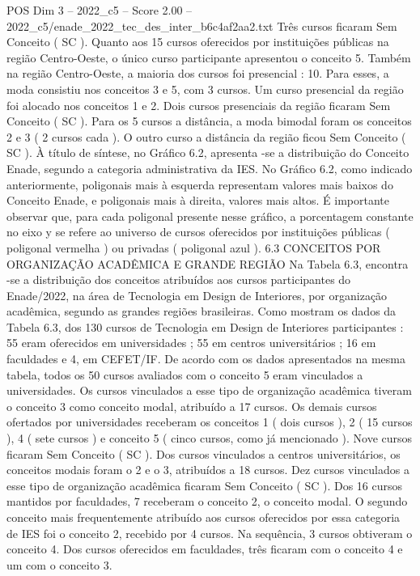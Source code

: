 \begin{textsample}{POS Dim 3 – 2022\_c5 – Score 2.00 – 2022\_c5/enade\_2022\_tec\_des\_inter\_b6c4af2aa2.txt}
Três cursos ficaram Sem Conceito ( SC ).
Quanto aos 15 cursos oferecidos por instituições públicas na região Centro-Oeste, o único curso participante apresentou o conceito 5.
Também na região Centro-Oeste, a maioria dos cursos foi presencial : 10.
Para esses, a moda consistiu nos conceitos 3 e 5, com 3 cursos.
Um curso presencial da região foi alocado nos conceitos 1 e 2.
Dois cursos presenciais da região ficaram Sem Conceito ( SC ).
Para os 5 cursos a distância, a moda bimodal foram os conceitos 2 e 3 ( 2 cursos cada ).
O outro curso a distância da região ficou Sem Conceito ( SC ).
À título de síntese, no Gráfico 6.2, apresenta -se a distribuição do Conceito Enade, segundo a categoria administrativa da IES.
No Gráfico 6.2, como indicado anteriormente, poligonais mais à esquerda representam valores mais baixos do Conceito Enade, e poligonais mais à direita, valores mais altos.
É importante observar que, para cada poligonal presente nesse gráfico, a porcentagem constante no eixo y se refere ao universo de cursos oferecidos por instituições públicas ( poligonal vermelha ) ou privadas ( poligonal azul ). 6.3 CONCEITOS POR ORGANIZAÇÃO ACADÊMICA E GRANDE REGIÃO Na Tabela 6.3, encontra -se a distribuição dos conceitos atribuídos aos cursos participantes do Enade/2022, na área de Tecnologia em Design de Interiores, por organização acadêmica, segundo as grandes regiões brasileiras.
Como mostram os dados da Tabela 6.3, dos 130 cursos de Tecnologia em Design de Interiores participantes : 55 eram oferecidos em universidades ; 55 em centros universitários ; 16 em faculdades e 4, em CEFET/IF.
De acordo com os dados apresentados na mesma tabela, todos os 50 cursos avaliados com o conceito 5 eram vinculados a universidades.
Os cursos vinculados a esse tipo de organização acadêmica tiveram o conceito 3 como conceito modal, atribuído a 17 cursos.
Os demais cursos ofertados por universidades receberam os conceitos 1 ( dois cursos ), 2 ( 15 cursos ), 4 ( sete cursos ) e conceito 5 ( cinco cursos, como já mencionado ).
Nove cursos ficaram Sem Conceito ( SC ).
Dos cursos vinculados a centros universitários, os conceitos modais foram o 2 e o 3, atribuídos a 18 cursos.
Dez cursos vinculados a esse tipo de organização acadêmica ficaram Sem Conceito ( SC ).
Dos 16 cursos mantidos por faculdades, 7 receberam o conceito 2, o conceito modal.
O segundo conceito mais frequentemente atribuído aos cursos oferecidos por essa categoria de IES foi o conceito 2, recebido por 4 cursos.
Na sequência, 3 cursos obtiveram o conceito 4.
Dos cursos oferecidos em faculdades, três ficaram com o conceito 4 e um com o conceito 3.

\end{textsample}
